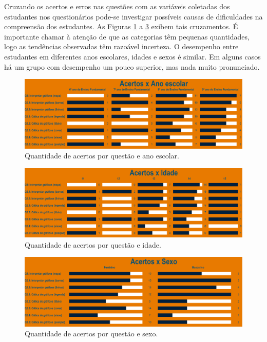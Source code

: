 \documentclass[
]{book}
\begin{document}
Cruzando os acertos e erros nas questões com as variáveis coletadas dos estudantes nos questionários pode-se investigar possíveis causas de dificuldades na compreensão dos estudantes. As Figuras \ref{fig:impacto29} a \ref{fig:impacto31} exibem tais cruzamentos. É importante chamar à atenção de que as categorias têm pequenas quantidades, logo as tendências observadas têm razoável incerteza. O desempenho entre estudantes em diferentes anos escolares, idades e sexos é similar. Em alguns casos há um grupo com desempenho um pouco superior, mas nada muito pronunciado.

\begin{figure}

{\centering \includegraphics[width=0.75\linewidth,height=0.75\textheight]{images/Impactos/29} 

}

\caption{Quantidade de acertos por questão e ano escolar.}\label{fig:impacto29}
\end{figure}

\begin{figure}

{\centering \includegraphics[width=0.75\linewidth,height=0.75\textheight]{images/Impactos/30} 

}

\caption{Quantidade de acertos por questão e idade.}\label{fig:impacto30}
\end{figure}

\begin{figure}

{\centering \includegraphics[width=0.75\linewidth,height=0.75\textheight]{images/Impactos/31} 

}

\caption{Quantidade de acertos por questão e sexo.}\label{fig:impacto31}
\end{figure}
\end{document}
